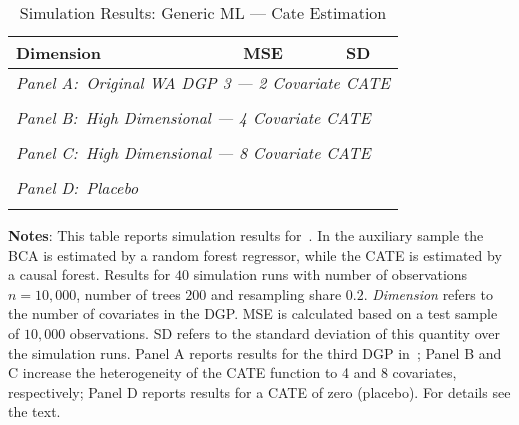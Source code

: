 \documentclass[11pt, a4paper, leqno]{article}
\begin{document}
\begin{table}
    \caption{Simulation Results: Generic ML --- Cate Estimation}\label{table:generic_ml_cate}
    \begin{threeparttable}
    \center
    \begin{tabular}{lcc}
        Dimension & MSE & SD \\
        \toprule
        \multicolumn{3}{l}{\textit{Panel A:\ Original WA DGP 3 --- 2 Covariate CATE}} \\
         \\
        \midrule

        \multicolumn{3}{l}{\textit{Panel B:\ High Dimensional --- 4 Covariate CATE}} \\
         \\
        \midrule

        \multicolumn{3}{l}{\textit{Panel C:\ High Dimensional --- 8 Covariate CATE}} \\
         \\
        \midrule

        \multicolumn{3}{l}{\textit{Panel D:\ Placebo}} \\
         \\
        \bottomrule
    \end{tabular}
    \begin{tablenotes}
        \small
        \item \textbf{Notes}: This table reports simulation results for~\citet{chernozhukov2023genml}.
        In the auxiliary sample the BCA is estimated by a random forest regressor, while the CATE is estimated by a causal forest.
        Results for $40$ simulation runs with number of observations $n=10,000$, number of trees $200$ and resampling share $0.2$.
        \textit{Dimension} refers to the number of covariates in the DGP\@.
        MSE is calculated based on a test sample of $10,000$ observations. SD refers to the standard deviation of this quantity over the simulation runs.
        Panel A reports results for the third DGP in~\citet{wager2018estimation}; Panel B and C increase the heterogeneity of the CATE function to 4 and 8 covariates, respectively; Panel D reports results for a CATE of zero (placebo).
        For details see the text.
    \end{tablenotes}
\end{threeparttable}

\end{table}
\end{document}

